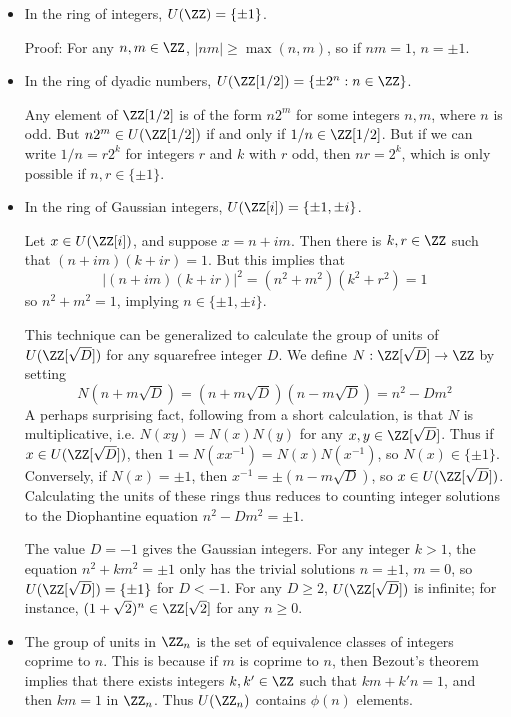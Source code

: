 \begin{itemize}
    \item In the ring of integers, $U(\ZZ) = \{ \pm 1 \}$.

    Proof: For any $n,m \in \ZZ$, $|nm| \geq \max(n,m)$, so if $nm = 1$, $n = \pm 1$.

    \item In the ring of dyadic numbers, $U(\ZZ[1/2]) = \{ \pm 2^n : n \in \ZZ \}$.

    Any element of $\ZZ[1/2]$ is of the form $n 2^m$ for some integers $n,m$, where $n$ is odd. But $n 2^m \in U(\ZZ[1/2])$ if and only if $1/n \in \ZZ[1/2]$. But if we can write $1/n = r 2^k$ for integers $r$ and $k$ with $r$ odd, then $nr = 2^k$, which is only possible if $n,r \in \{ \pm 1 \}$.

    \item In the ring of Gaussian integers, $U(\ZZ[i]) = \{ \pm 1, \pm i \}$.

    Let $x \in U(\ZZ[i])$, and suppose $x = n + im$. Then there is $k,r \in \ZZ$ such that $(n + im)(k + ir) = 1$. But this implies that
    \[ |(n + im)(k + ir)|^2 = (n^2 + m^2)(k^2 + r^2) = 1 \]
    so $n^2 + m^2 = 1$, implying $n \in \{ \pm 1, \pm i \}$.

    This technique can be generalized to calculate the group of units of $U(\ZZ[\sqrt{D}])$ for any squarefree integer $D$. We define $N: \ZZ[\sqrt{D}] \to \ZZ$ by setting
    \[ N(n + m \sqrt{D}) = \left(n + m\sqrt{D} \right) \left(n - m\sqrt{D} \right) = n^2 - D m^2 \]
    A perhaps surprising fact, following from a short calculation, is that $N$ is multiplicative, i.e. $N(xy) = N(x) N(y)$ for any $x,y \in \ZZ[\sqrt{D}]$. Thus if $x \in U(\ZZ[\sqrt{D}])$, then $1 = N(xx^{-1}) = N(x) N(x^{-1})$, so $N(x) \in \{ \pm 1 \}$. Conversely, if $N(x) = \pm 1$, then $x^{-1} = \pm (n - m \sqrt{D})$, so $x \in U(\ZZ[\sqrt{D}])$. Calculating the units of these rings thus reduces to counting integer solutions to the Diophantine equation $n^2 - D m^2 = \pm 1$.

    The value $D = -1$ gives the Gaussian integers. For any integer $k > 1$, the equation $n^2 + k m^2 = \pm 1$ only has the trivial solutions $n = \pm 1$, $m = 0$, so $U(\ZZ[\sqrt{D}]) = \{ \pm 1 \}$ for $D < -1$. For any $D \geq 2$, $U(\ZZ[\sqrt{D}])$ is infinite; for instance, $(1 + \sqrt{2})^n \in \ZZ[\sqrt{2}]$ for any $n \geq 0$.

    \item The group of units in $\ZZ_n$ is the set of equivalence classes of integers coprime to $n$. This is because if $m$ is coprime to $n$, then Bezout's theorem implies that there exists integers $k,k' \in \ZZ$ such that $km + k'n = 1$, and then $km = 1$ in $\ZZ_n$. Thus $U(\ZZ_n)$ contains $\phi(n)$ elements.


\end{itemize}
